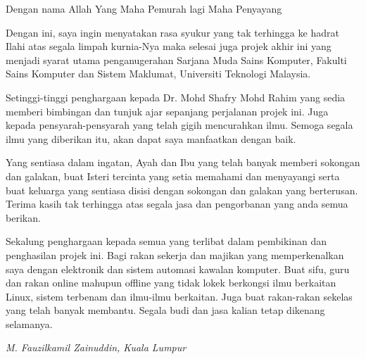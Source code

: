 \begin{acknowledgement}

Dengan nama Allah Yang Maha Pemurah lagi Maha Penyayang

Dengan ini, saya ingin menyatakan rasa syukur yang tak terhingga ke hadrat Ilahi atas segala limpah kurnia-Nya maka selesai juga projek akhir ini yang menjadi syarat utama penganugerahan Sarjana Muda Sains Komputer, Fakulti Sains Komputer dan Sistem Maklumat, Universiti Teknologi Malaysia.

Setinggi-tinggi penghargaan kepada Dr. Mohd Shafry Mohd Rahim yang sedia memberi bimbingan dan tunjuk ajar sepanjang perjalanan projek ini. Juga kepada pensyarah-pensyarah yang telah gigih mencurahkan ilmu. Semoga segala ilmu yang diberikan itu, akan dapat saya manfaatkan dengan baik.

Yang sentiasa dalam ingatan, Ayah dan Ibu yang telah banyak memberi sokongan dan galakan, buat Isteri tercinta yang setia memahami dan menyayangi serta buat keluarga yang sentiasa disisi dengan sokongan dan galakan yang berterusan. Terima kasih tak terhingga atas segala jasa dan pengorbanan yang anda semua berikan.

Sekalung penghargaan kepada semua yang terlibat dalam pembikinan dan penghasilan projek ini. Bagi rakan sekerja dan majikan yang memperkenalkan saya dengan elektronik dan sistem automasi kawalan komputer. Buat sifu, guru dan rakan online mahupun offline yang tidak lokek berkongsi ilmu berkaitan Linux, sistem terbenam dan ilmu-ilmu berkaitan. Juga buat rakan-rakan sekelas yang telah banyak membantu. Segala budi dan jasa kalian tetap dikenang selamanya.

\begin{flushright}
\textit{M. Fauzilkamil Zainuddin, Kuala Lumpur}
\end{flushright}
\end{acknowledgement}

